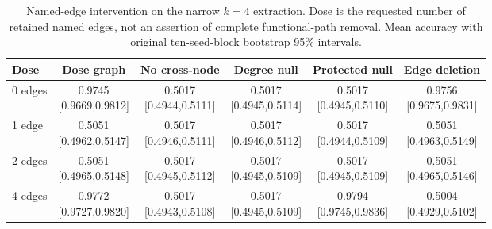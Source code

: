 \begin{table}[H]\centering
\caption{Named-edge intervention on the narrow $k=4$ extraction. Dose is the requested number of retained named edges, not an assertion of complete functional-path removal. Mean accuracy with original ten-seed-block bootstrap 95\% intervals.}\label{tab:edge-full}
\small\setlength{\tabcolsep}{4pt}
\begin{tabular}{lccccc}\toprule
Dose & Dose graph & No cross-node & Degree null & Protected null & Edge deletion \\ \midrule
0 edges & \shortstack{0.9745\\{}[0.9669,0.9812]} & \shortstack{0.5017\\{}[0.4944,0.5111]} & \shortstack{0.5017\\{}[0.4945,0.5114]} & \shortstack{0.5017\\{}[0.4945,0.5110]} & \shortstack{0.9756\\{}[0.9675,0.9831]} \\[3pt]
1 edge & \shortstack{0.5051\\{}[0.4962,0.5147]} & \shortstack{0.5017\\{}[0.4946,0.5111]} & \shortstack{0.5017\\{}[0.4946,0.5112]} & \shortstack{0.5017\\{}[0.4944,0.5109]} & \shortstack{0.5051\\{}[0.4963,0.5149]} \\[3pt]
2 edges & \shortstack{0.5051\\{}[0.4965,0.5148]} & \shortstack{0.5017\\{}[0.4945,0.5112]} & \shortstack{0.5017\\{}[0.4945,0.5109]} & \shortstack{0.5017\\{}[0.4945,0.5109]} & \shortstack{0.5051\\{}[0.4965,0.5146]} \\[3pt]
4 edges & \shortstack{0.9772\\{}[0.9727,0.9820]} & \shortstack{0.5017\\{}[0.4943,0.5108]} & \shortstack{0.5017\\{}[0.4945,0.5109]} & \shortstack{0.9794\\{}[0.9745,0.9836]} & \shortstack{0.5004\\{}[0.4929,0.5102]} \\[3pt]
\bottomrule\end{tabular}
\end{table}
